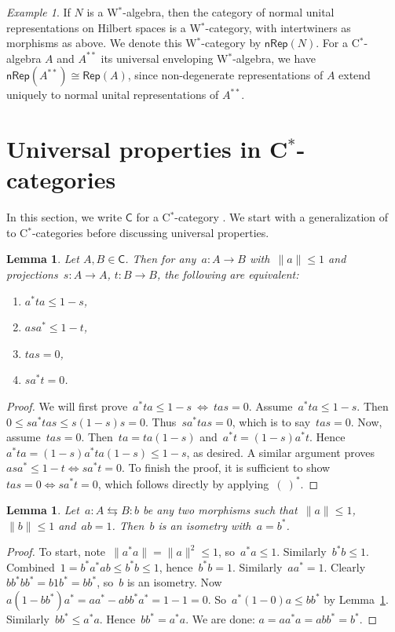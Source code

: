 \documentclass[reqno,T1,11pt]{amsproc}
\newcommand{\cat}[1]{\mathsf{#1}}		%
\newcommand{\Rep}[1]{\mathsf{Rep}(#1)}		%
\newcommand{\NRep}[1]{\mathsf{nRep}(#1)}	%
\theoremstyle{plain}
\newtheorem{lem}[thm]{Lemma}
\theoremstyle{remark}
\newtheorem{ex}[thm]{Example}
\numberwithin{equation}{section}
\begin{document}
\begin{ex}
\label{nrep_ex}
If $N$ is a W$^*$-algebra, then the category of normal unital representations on Hilbert spaces is a W$^*$-category, with intertwiners as morphisms as above. We denote this W$^*$-category by $\NRep{N}$. For a C$^*$-algebra $A$ and $A^{**}$ its universal enveloping W$^*$-algebra, we have $\NRep{A^{**}} \cong \Rep{A}$, since non-degenerate representations of $A$ extend uniquely to normal unital representations of $A^{**}$.
\end{ex}

\section{Universal properties in C$^*$-categories}
\label{univ_props}

In this section, we write $\cat{C}$ for a C$^*$-category \cite{wstarcat}.
We start with a generalization of~\cite[Lemma 7]{westerbaan2016universal}
    to C$^*$-categories before discussing universal properties.

\begin{lem}
	Let $A,B\in\cat{C}$. Then for any~$a\colon A \to B$ with~$\|a\| \leq 1$
    and projections~$s \colon A \to A$,
        $t\colon B\to B$,
	the following are equivalent:
\begin{enumerate}
\item $a^* t a \leq 1-s$,
\item $a s a^* \leq 1 - t$,
\item $tas = 0$,
\item $sa^* t = 0$.
\end{enumerate}
\label{contrapositionlemma}
\end{lem}
\begin{proof}
We will first prove~$a^*t a \leq 1-s \:\Leftrightarrow\: tas=0$.
    Assume~$a^* t a \leq 1-s$.
    Then~$0 \leq s a^* t a s \leq s (1-s) s = 0$.
    Thus~$s a^* t a s = 0$, which is to say~$tas = 0$.
    Now, assume~$tas = 0$.
    Then~$ta = ta(1-s)$ and~$a^*t = (1-s)a^* t$.
    Hence~$a^* ta = (1-s)a^*ta(1-s) \leq 1-s$, as desired.
A similar argument proves~$as a^* \leq 1-t \Leftrightarrow sa^*t=0$.
To finish the proof, it is sufficient to
        show~$tas=0 \Leftrightarrow sa^*t=0$, which follows directly
        by applying~$(\ )^*$.
\end{proof}

\begin{lem}
Let~$a \colon A \leftrightarrows B \colon b$ be any two morphisms
    such that~$\|a \| \leq 1$, $\| b\| \leq 1$ and~$ab=1$.
    Then~$b$ is an isometry with~$a=b^*$.
\label{isometrylemma}
\end{lem}
\begin{proof}
    To start, note~$\|a ^*a\| = \|a\|^2 \leq 1$, so~$a^*a \leq 1$.
    Similarly~$b^*b \leq 1$.
    Combined~$1 = b^*a^*ab \leq b^*b \leq 1$, hence~$b^*b=1$.
    Similarly~$aa^*=1$.
    Clearly~$bb^*bb^* = b 1 b^* = bb^*$, so~$b$ is an isometry.
    Now~$a (1-bb^*) a^* = aa^* - abb^*a^* = 1-1=0$.
    So~$a^* (1-0) a \leq bb^*$ by Lemma~\ref{contrapositionlemma}.
    Similarly~$bb^* \leq a^*a$. Hence~$bb^*=a^*a$.
    We are done: $a = aa^*a=abb^*=b^*$.
\end{proof}
\end{document}
